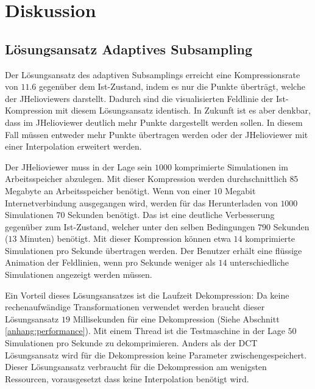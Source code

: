 \section{Diskussion}

\subsection{Lösungsansatz Adaptives Subsampling}
Der Lösungsansatz des adaptiven Subsamplings erreicht eine Kompressionsrate von $11.6$ gegenüber dem Ist-Zustand, indem es nur die Punkte überträgt, welche der JHelioviewers darstellt. Dadurch sind die visualisierten Feldlinie der Ist-Kompression mit diesem Lösungsansatz identisch. In Zukunft ist es aber denkbar, dass im JHelioviewer deutlich mehr Punkte dargestellt werden sollen. In diesem Fall müssen entweder mehr Punkte übertragen werden oder der JHelioviewer mit einer Interpolation erweitert werden.

Der JHelioviewer muss in der Lage sein $1000$ komprimierte Simulationen im Arbeitsspeicher abzulegen. Mit dieser Kompression werden durchschnittlich $85$ Megabyte an Arbeitsspeicher benötigt. Wenn von einer $10$ Megabit Internetverbindung ausgegangen wird, werden für das Herunterladen von $1000$ Simulationen $70$ Sekunden benötigt. Das ist eine deutliche Verbesserung gegenüber zum Ist-Zustand, welcher unter den selben Bedingungen $790$ Sekunden ($13$ Minuten) benötigt. Mit dieser Kompression können etwa $14$ komprimierte Simulationen pro Sekunde übertragen werden. Der Benutzer erhält eine flüssige Animation der Feldlinien, wenn pro Sekunde weniger als $14$ unterschiedliche Simulationen angezeigt werden müssen.

Ein Vorteil dieses Lösungsansatzes ist die Laufzeit Dekompression: Da keine rechenaufwändige Transformationen verwendet werden braucht dieser Lösungsansatz $19$ Millisekunden für eine Dekompression (Siehe Abschnitt \ref{anhang:performance}). Mit einem Thread ist die Testmaschine in der Lage $50$ Simulationen pro Sekunde zu dekomprimieren. Anders als der DCT Lösungsansatz wird für die Dekompression keine Parameter zwischengespeichert. Dieser Lösungsansatz verbraucht für die Dekompression am wenigsten Ressourcen, vorausgesetzt dass keine Interpolation benötigt wird.

